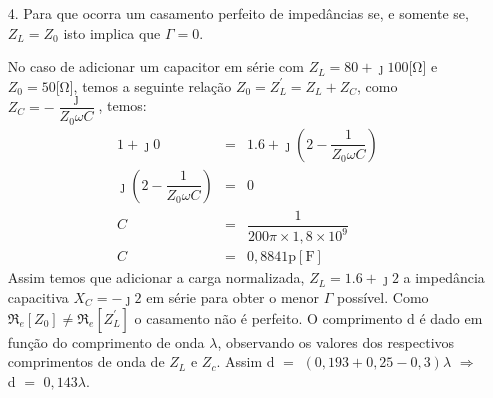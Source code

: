 \begin{enumerate}[1.]
Para a admitância estende-se a reta de Z$_{Ln}$ para completar o diâmetro da circunferência. Marcando um ponto com a mesma distância de Z$_{Ln}$ ao centro sendo no sentido contrário, temos o ponto Y$_{Ln} = 0,24 - \jmath 0,3$. Assim Y$_{L}$ $=$ $\dfrac{Z_{0}}{Y_{Ln}}$ $=$ $\dfrac{50}{0,24 - \jmath 0,3}$ $\Rightarrow$ Y$_{L}$ $\approx$ $81,3 + \jmath 101.62$ $=$ $130.1\phase{51,34^{\circ}}$[\si{\siemens}].

A impedância da carga a $0.15\lambda$ é encontrada girando a carta de Smith no sentido do gerador. Uma volta completa representa $0.5\lambda$, como queremos calcular a impedância a $0.15\lambda$ da carga temos $(0,5 - d)\lambda = 0,15\lambda$ $\Rightarrow$ d $=$ $0,35\lambda$. É traçado um segmento de reta da origem a marcação de $0,35\lambda$ e com o compasso faz-se um arco, seguindo a circunferência a qual o ponto $(1.6,2)$ pertence. O ponto aonde o compasso coincide com o segmento de reta é a impedância desejada. No caso Z$_{in} \approx 0,58 - \jmath 1,19$ $\Rightarrow$ Z$_{in} = 1,32\phase{-64,01^\circ}$[\si{\ohm}]

O cálculo do 1\textordmasculine pico de tensão, para uma linha de comprimento $0,35\lambda$, temos que a distância em relação a carga é dada por d$_{V_{M}}$ $=$ $(0,25 - 0,2) \cdot 0,35\lambda$ $\Rightarrow$ d$_{V_{M}}$ $=$ $0,0175\lambda$. O 1\textordmasculine vale é dado por d$_{V_{m}} = (d_{V_{M}} + 0,25 \cdot 0,35)\lambda$ $\Rightarrow$ d$_{V_{m}}$ $=$ $0,105\lambda$

A impedância de entrada, para a linha de $0,35\lambda$ de comprimento, é dado pelo giro de $0,15\lambda$ na direção da carga seja $0,45\lambda$ ou $0,05\lambda$ na direção do gerador. No caso Z$_{in} \approx 0,25 - \jmath 0,3$ $\Rightarrow$ Z$_{in} = 0,39\phase{50,19^\circ}$[\si{\ohm}].

\item[4.] Para que ocorra um casamento perfeito de impedâncias se, e somente se, $Z_{L} = Z_{0}$ isto implica que $\Gamma = 0$.

No caso de adicionar um capacitor em série com $Z_{L} = 80 + \jmath 100$[\si{\ohm}] e $Z_{0} = 50$[\si{\ohm}], temos a seguinte relação $Z_{0} = Z^{'}_{L} = Z_{L} + Z_{C}$, como $Z_{C} = -\dfrac{\jmath}{Z_{0} \omega C}$, temos:
%
\begin{eqnarray*}
1 + \jmath 0 & = & 1.6 + \jmath (2 - \dfrac{1}{Z_{0} \omega C}) \\
\jmath (2 - \dfrac{1}{Z_{0} \omega C}) & = & 0 \\
C & = & \dfrac{1}{200\pi \times 1,8 \times 10^{9}} \\
C & = & 0,8841 \si{\pico}[\si{\farad}]
\end{eqnarray*}
%
Assim temos que adicionar a carga normalizada, $Z_{L} = 1.6 + \jmath 2$ a impedância capacitiva $X_{C} = -\jmath 2$ em série para obter o menor $\Gamma$ possível. Como $\mathfrak{R}_{e}[Z_{0}] \neq \mathfrak{R}_{e}[Z^{'}_{L}]$ o casamento não é perfeito. O comprimento d é dado em função do comprimento de onda $\lambda$, observando os valores dos respectivos comprimentos de onda de $Z_{L}$ e $Z_{c}$. Assim d $=$ $(0,193 + 0,25 - 0,3)\lambda$ $\Rightarrow$ d $=$ $0,143\lambda$.


\end{enumerate}
